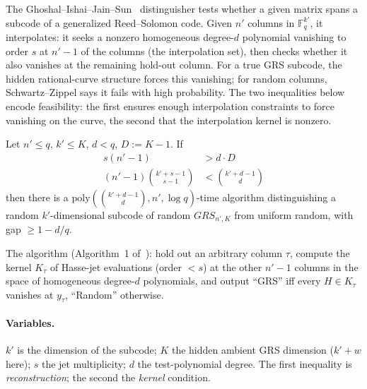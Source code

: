 The Ghoshal--Ishai--Jain--Sun~\cite{GIJS26} distinguisher tests whether a given matrix spans
a subcode of a generalized Reed--Solomon code. Given $n'$ columns in
$\mathbb{F}_q^{k'}$, it interpolates: it seeks a nonzero homogeneous degree-$d$
polynomial vanishing to order $s$ at $n'-1$ of the columns (the interpolation
set), then checks whether it also vanishes at the remaining hold-out column.
For a true GRS subcode, the hidden rational-curve structure forces this
vanishing; for random columns, Schwartz--Zippel says it fails with high
probability. The two inequalities below encode feasibility: the first ensures
enough interpolation constraints to force vanishing on the curve, the second
that the interpolation kernel is nonzero.

\begin{theorem}\label{thm:ghoshal}
    Let $n' \leq q$, $k' \leq K$, $d < q$, $D := K-1$. If
    \begin{align}
        s(n'-1)                   & > d\cdot D \label{eq:ghoshal1}          \\
        (n'-1)\binom{k'+s-1}{s-1} & < \binom{k'+d-1}{d} \label{eq:ghoshal2}
    \end{align}
    then there is a $\mathrm{poly}\!\left(\binom{k'+d-1}{d}, n', \log
        q\right)$-time
    algorithm distinguishing a random $k'$-dimensional subcode of random
    $GRS_{n',K}$
    from uniform random, with gap $\geq 1 - d/q$.
\end{theorem}
The algorithm (Algorithm~1 of~\cite{GIJS26}): hold out an arbitrary column
$\tau$, compute
the kernel $K_\tau$ of Hasse-jet evaluations (order $< s$) at the other $n'-1$
columns in the space of homogeneous degree-$d$ polynomials, and output ``GRS''
iff every $H \in K_\tau$ vanishes at $y_\tau$, ``Random'' otherwise.

\paragraph{Variables.} $k'$ is the dimension of the subcode; $K$ the
hidden ambient GRS dimension ($k' + w$ here); $s$ the jet multiplicity; $d$ the
test-polynomial degree. The first inequality is \emph{reconstruction}; the
second the \emph{kernel} condition.